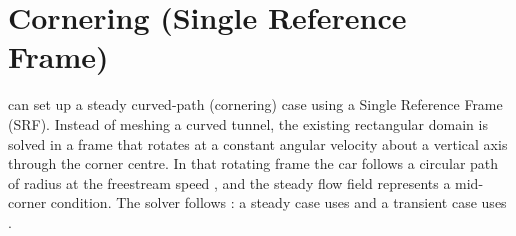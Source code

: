 \section{Cornering (Single Reference Frame)}
 can set up a steady curved-path (cornering) case using a Single Reference Frame (SRF). Instead of meshing a curved tunnel, the existing rectangular domain is solved in a frame that rotates at a constant angular velocity about a vertical axis through the corner centre. In that rotating frame the car follows a circular path of radius  at the freestream speed , and the steady flow field represents a mid-corner condition. The solver follows : a steady case uses  and a transient case uses .


